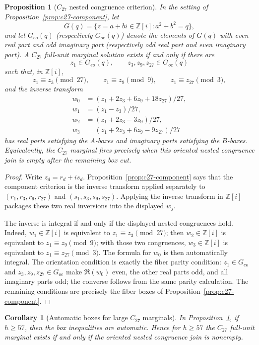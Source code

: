 \documentclass[11pt]{article}
\theoremstyle{plain}
\newtheorem{proposition}[theorem]{Proposition}
\newtheorem{corollary}[theorem]{Corollary}
\theoremstyle{definition}
\theoremstyle{remark}
\newcommand{\Z}{\mathbb Z}
\begin{document}
\begin{proposition}[$C_{27}$ nested congruence criterion]\label{prop:c27-nested}
In the setting of Proposition~\ref{prop:c27-component}, let
\[
  G(q)=\{z=a+bi\in\Z[i]: a^2+b^2=q\},
\]
and let $G_{eo}(q)$ (respectively $G_{oe}(q)$) denote the elements of $G(q)$
with even real part and odd imaginary part (respectively odd real part and even
imaginary part).  A $C_{27}$ full-unit marginal solution exists if and only if
there are
\[
  z_1\in G_{eo}(q),\qquad z_3,z_9,z_{27}\in G_{oe}(q)
\]
such that, in $\Z[i]$,
\[
  z_1\equiv z_3\pmod{27},\qquad
  z_1\equiv z_9\pmod 9,\qquad
  z_1\equiv z_{27}\pmod 3,
\]
and the inverse transform
\[
\begin{aligned}
  w_0&=(z_1+2z_3+6z_9+18z_{27})/27,\\
  w_1&=(z_1-z_3)/27,\\
  w_2&=(z_1+2z_3-3z_9)/27,\\
  w_3&=(z_1+2z_3+6z_9-9z_{27})/27
\end{aligned}
\]
has real parts satisfying the $A$-boxes and imaginary parts satisfying the
$B$-boxes.  Equivalently, the $C_{27}$ marginal fires precisely when this
oriented nested congruence join is empty after the remaining box cut.
\end{proposition}

\begin{proof}
Write $z_d=r_d+is_d$.  Proposition~\ref{prop:c27-component} says that the
component criterion is the inverse transform applied separately to
$(r_1,r_3,r_9,r_{27})$ and $(s_1,s_3,s_9,s_{27})$.  Applying the inverse
transform in $\Z[i]$ packages these two real inversions into the displayed
$w_j$.

The inverse is integral if and only if the displayed nested congruences hold.
Indeed, $w_1\in\Z[i]$ is equivalent to $z_1\equiv z_3\pmod{27}$; then
$w_2\in\Z[i]$ is equivalent to $z_1\equiv z_9\pmod9$; with those two congruences,
$w_3\in\Z[i]$ is equivalent to $z_1\equiv z_{27}\pmod3$.  The formula for $w_0$
is then automatically integral.  The orientation condition is exactly the
fiber parity condition: $z_1\in G_{eo}$ and $z_3,z_9,z_{27}\in G_{oe}$ make
$\Re(w_0)$ even, the other real parts odd, and all imaginary parts odd; the
converse follows from the same parity calculation.  The remaining conditions
are precisely the fiber boxes of Proposition~\ref{prop:c27-component}.
\end{proof}

\begin{corollary}[Automatic boxes for large $C_{27}$ marginals]\label{cor:c27-auto-box}
In Proposition~\ref{prop:c27-nested}, if $h\ge57$, then the box inequalities are
automatic.  Hence for $h\ge57$ the $C_{27}$ full-unit marginal exists if and
only if the oriented nested congruence join is nonempty.
\end{corollary}
\end{document}
